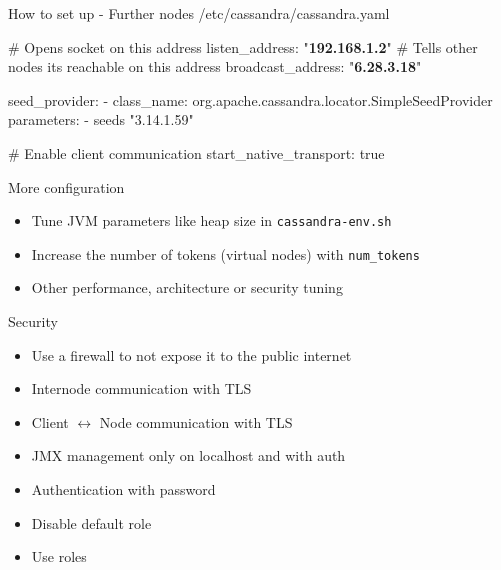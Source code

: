 \documentclass[
  10pt
]{beamer}
\begin{document}
\begin{frame}[fragile]{How to set up - Further nodes}
  /etc/cassandra/cassandra.yaml
  \begin{semiverbatim}
# Opens socket on this address
listen_address: "\textbf{192.168.1.2}"
# Tells other nodes its reachable on this address
broadcast_address: "\textbf{6.28.3.18}"

seed_provider:
  - class_name: org.apache.cassandra.locator.SimpleSeedProvider
    parameters:
      - seeds "3.14.1.59"

# Enable client communication
start_native_transport: true
  \end{semiverbatim}
\end{frame}

\begin{frame}{More configuration}
  \begin{itemize}
    \item Tune JVM parameters like heap size in \lstinline{cassandra-env.sh}
    \item Increase the number of tokens (virtual nodes) with \lstinline{num_tokens}
    \item Other performance, architecture or security tuning
  \end{itemize}
\end{frame}

\begin{frame}{Security}
  \begin{itemize}
    \item<1-> Use a firewall to not expose it to the public internet
    \item<2-> Internode communication with TLS
    \item<2-> Client $\leftrightarrow$ Node communication with TLS
    \item<3-> JMX management only on localhost and with auth
    \item<4-> Authentication with password
    \item<5-> Disable default role
    \item<5-> Use roles
  \end{itemize}
\end{frame}

\end{document}
